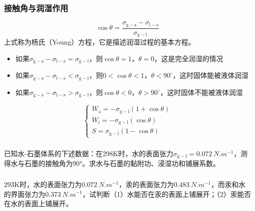 \begin{frame}
    \frametitle{接触角与润湿作用}
    \[
        \cos \theta = \frac{\sigma_{\mathrm{g-s}} - \sigma_{\mathrm{l-s}}}{\sigma_{\mathrm{g-l}}}
    \]
    上式称为杨氏（Young）方程，它是描述润湿过程的基本方程。
    \begin{itemize}
        \item 如果$\sigma_{\mathrm{g-s}} - \sigma_{\mathrm{l-s}} = \sigma_{\mathrm{g-l}}$，则$\cos \theta=1$，$\theta = 0$，这是完全润湿的情况
        \item 如果$\sigma_{\mathrm{g-s}} - \sigma_{\mathrm{l-s}} < \sigma_{\mathrm{g-l}}$，则$0<\cos \theta<1$，$\theta < 90^{\circ}$，这时固体能被液体润湿
        \item 如果$\sigma_{\mathrm{g-s}} - \sigma_{\mathrm{l-s}} > \sigma_{\mathrm{g-l}}$，则$\cos \theta<0$，$\theta > 90^{\circ}$，这时固体不能被液体润湿
    \end{itemize}
    \[
        \begin{cases}
            W_\mathrm{a} = - \sigma_{\mathrm{g-l}} (1 + \cos \theta) \\
            W_\mathrm{i} = - \sigma_{\mathrm{g-l}} (\cos \theta) \\
            S = \sigma_{\mathrm{g-l}}(1 - \cos \theta)
        \end{cases}
    \]

\end{frame}


\begin{frame}[t]
    \frametitle{}

    \begin{example}
        已知水-石墨体系的下述数据：在298K时，水的表面张力$\sigma_{\mathrm{g-l}} = \SI{0.072}{N.m^{-1}}$，测得水与石墨的接触角为90°。求水与石墨的黏附功、浸湿功和铺展系数。
    \end{example}

\end{frame}


\begin{frame}[t]
    \frametitle{}

    \begin{example}
        293K时，水的表面张力为$\SI{0.072}{N.m^{-1}}$，汞的表面张力为$\SI{0.483}{N.m^{-1}}$，而汞和水的界面张力为$\SI{0.373}{N.m^{-1}}$，试判断（1）水能否在汞的表面上铺展开；（2）汞能否在水的表面上铺展开。
    \end{example}

\end{frame}